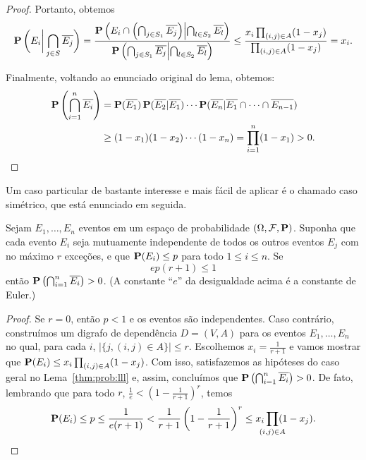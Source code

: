 \begin{proof}
Portanto, obtemos
\begin{align*}
  \operatorname{\mathbf{P}}\bigg( E_i \bigg| \bigcap_{j \in S} \overline{E_j} \bigg) = \frac{\operatorname{\mathbf{P}}\left( E_i \cap \left(\bigcap_{j \in S_1} \overline{E_j} \right) \middle| \bigcap_{l \in S_2} \overline{E_l} \right)}{\operatorname{\mathbf{P}}\left( \bigcap_{j \in S_1} \overline{E_j} \middle| \bigcap_{l \in S_2} \overline{E_l} \right)} \leq \frac{x_i\prod_{(i,j) \in A}(1-x_j)}{\prod_{(i,j) \in A}(1-x_j)} = x_i.
\end{align*}

Finalmente, voltando ao enunciado original do lema, obtemos:
\begin{align*}
\operatorname{\mathbf{P}} \left( \bigcap_{i = 1}^n \overline{E_i} \right) &= \operatorname{\mathbf{P}} (\overline{E_1}) \operatorname{\mathbf{P}} (\overline{E_2} | \overline{E_1} ) \cdots \operatorname{\mathbf{P}}( \overline{E_n} | \overline{E_1} \cap \dots \cap \overline{E_{n-1}}) \\
&\geq (1 - x_1)(1 - x_2)\cdots(1-x_n) = \prod_{i=1}^n(1 - x_1) > 0. \qedhere
\end{align*}
\end{proof}

Um caso particular de bastante interesse e mais fácil de aplicar é o chamado caso simétrico, que está enunciado em seguida.

\begin{lemma}
\label{thm:prob:llls}
Sejam $E_1, \dots, E_n$ eventos em um espaço de probabilidade $(\Omega, \mathcal{F}, \operatorname{\mathbf{P}})$. Suponha que cada evento $E_i$ seja mutuamente independente de todos os outros eventos $E_j$ com no máximo $r$ exceções, e que $\operatorname{\mathbf{P}}(E_i) \leq p$ para todo $1 \leq i \leq n$. Se
\[ ep(r+1) \leq 1 \]
então $\operatorname{\mathbf{P}} \left( \bigcap_{i = 1}^n \overline{E_i} \right) > 0$. (A constante ``$e$'' da desigualdade acima é a constante de Euler.)
\end{lemma}
\begin{proof}
Se $r = 0$, então $p < 1$ e os eventos são independentes. Caso contrário, construímos um digrafo de dependência $D = (V,A)$ para os eventos $E_1, \dots, E_n$ no qual, para cada $i$, $|\{j, (i,j) \in A\}| \leq r$. Escolhemos $x_i = \frac{1}{r+1}$ e vamos mostrar que $\operatorname{\mathbf{P}} (E_i) \leq x_i \prod_{(i,j) \in A}(1-x_j)$.
Com isso, satisfazemos as hipóteses do caso geral no Lema~\ref{thm:prob:lll} e, assim, concluímos que $\operatorname{\mathbf{P}} \left( \bigcap_{i = 1}^n \overline{E_i} \right) > 0$. De fato, lembrando que para todo $r$, $\frac{1}{e} < (1 - \frac{1}{r+1})^r$, temos
\[ \prob(E_i) \leq p \leq \frac{1}{e(r+1)} < \frac{1}{r+1}\left(1 - \frac{1}{r+1} \right)^r \leq x_i \prod_{\mathclap{(i,j) \in A}}(1-x_j). \qedhere\]
\end{proof}

